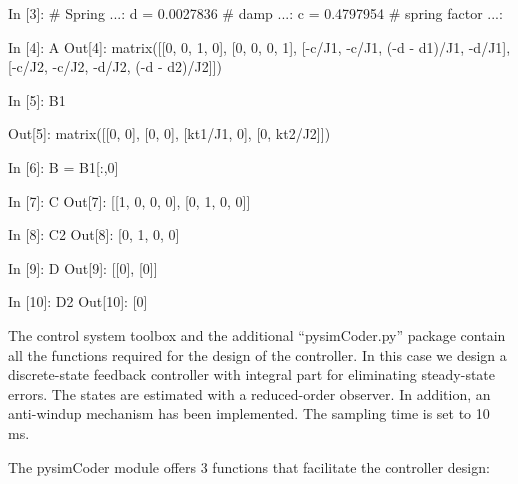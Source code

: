 \begin{code}
In [3]: # Spring         
   ...: d = 0.0027836   # damp
   ...: c = 0.4797954   # spring factor
   ...: 
\end{code}
 
\begin{code}

In [4]: A
Out[4]: 
matrix([[0, 0, 1, 0],
        [0, 0, 0, 1],
        [-c/J1, -c/J1, (-d - d1)/J1, -d/J1],
        [-c/J2, -c/J2, -d/J2, (-d - d2)/J2]])

In [5]: B1

Out[5]: 
matrix([[0, 0],
        [0, 0],
        [kt1/J1, 0],
        [0, kt2/J2]])

In [6]: B = B1[:,0]
        
In [7]: C
Out[7]: [[1, 0, 0, 0], [0, 1, 0, 0]]

In [8]: C2
Out[8]: [0, 1, 0, 0]

In [9]: D
Out[9]: [[0], [0]]

In [10]: D2
Out[10]: [0]
\end{code}

The control system toolbox and the additional ``pysimCoder.py'' package contain 
all the functions required for the design of the controller. In this case
we design a discrete-state feedback controller with integral part for 
eliminating steady-state errors. The states are estimated with a reduced-order 
observer.
In addition, an anti-windup mechanism has been implemented. The sampling time 
is set to 10 ms.

The pysimCoder module offers 3 functions that facilitate the controller 
design:

